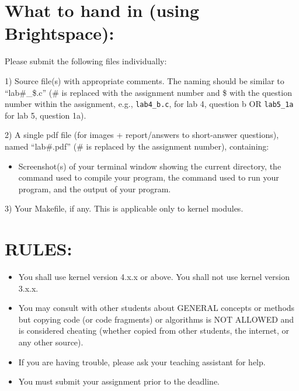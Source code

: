 \documentclass{article}
\begin{document}
\section*{What to hand in (using Brightspace):}

Please submit the following files individually:

1) Source file(s) with appropriate comments. The naming should be similar to “lab\#\_\$.c” (\# is replaced with the assignment number and \$ with the question number within the assignment, e.g., \texttt{lab4\_b.c}, for lab 4, question b OR \texttt{lab5\_1a} for lab 5, question 1a).

2) A single pdf file (for images + report/answers to short-answer questions), named “lab\#.pdf” (\# is replaced by the assignment number), containing:
    \begin{itemize}
        \item Screenshot(s) of your terminal window showing the current directory, the command used to compile your program, the command used to run your program, and the output of your program.
    \end{itemize}

3) Your Makefile, if any. This is applicable only to kernel modules.


\section*{RULES:}

\begin{itemize}
    \item You shall use kernel version 4.x.x or above. You shall not use kernel version 3.x.x.
    \item You may consult with other students about GENERAL concepts or methods but copying code (or code fragments) or algorithms is NOT ALLOWED and is considered cheating (whether copied from other students, the internet, or any other source).
    \item If you are having trouble, please ask your teaching assistant for help.
    \item You must submit your assignment prior to the deadline.
\end{itemize}
\end{document}
